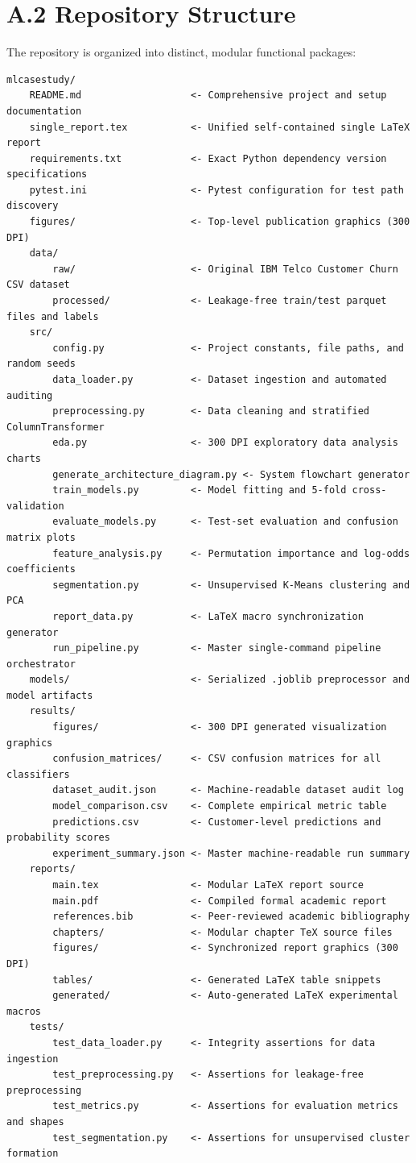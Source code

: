 \documentclass[12pt,a4paper]{report}
\begin{document}
\section*{A.2 Repository Structure}
The repository is organized into distinct, modular functional packages:
{\footnotesize
\begin{verbatim}
mlcasestudy/
    README.md                   <- Comprehensive project and setup documentation
    single_report.tex           <- Unified self-contained single LaTeX report
    requirements.txt            <- Exact Python dependency version specifications
    pytest.ini                  <- Pytest configuration for test path discovery
    figures/                    <- Top-level publication graphics (300 DPI)
    data/
        raw/                    <- Original IBM Telco Customer Churn CSV dataset
        processed/              <- Leakage-free train/test parquet files and labels
    src/
        config.py               <- Project constants, file paths, and random seeds
        data_loader.py          <- Dataset ingestion and automated auditing
        preprocessing.py        <- Data cleaning and stratified ColumnTransformer
        eda.py                  <- 300 DPI exploratory data analysis charts
        generate_architecture_diagram.py <- System flowchart generator
        train_models.py         <- Model fitting and 5-fold cross-validation
        evaluate_models.py      <- Test-set evaluation and confusion matrix plots
        feature_analysis.py     <- Permutation importance and log-odds coefficients
        segmentation.py         <- Unsupervised K-Means clustering and PCA
        report_data.py          <- LaTeX macro synchronization generator
        run_pipeline.py         <- Master single-command pipeline orchestrator
    models/                     <- Serialized .joblib preprocessor and model artifacts
    results/
        figures/                <- 300 DPI generated visualization graphics
        confusion_matrices/     <- CSV confusion matrices for all classifiers
        dataset_audit.json      <- Machine-readable dataset audit log
        model_comparison.csv    <- Complete empirical metric table
        predictions.csv         <- Customer-level predictions and probability scores
        experiment_summary.json <- Master machine-readable run summary
    reports/
        main.tex                <- Modular LaTeX report source
        main.pdf                <- Compiled formal academic report
        references.bib          <- Peer-reviewed academic bibliography
        chapters/               <- Modular chapter TeX source files
        figures/                <- Synchronized report graphics (300 DPI)
        tables/                 <- Generated LaTeX table snippets
        generated/              <- Auto-generated LaTeX experimental macros
    tests/
        test_data_loader.py     <- Integrity assertions for data ingestion
        test_preprocessing.py   <- Assertions for leakage-free preprocessing
        test_metrics.py         <- Assertions for evaluation metrics and shapes
        test_segmentation.py    <- Assertions for unsupervised cluster formation
\end{verbatim}
}
\end{document}
